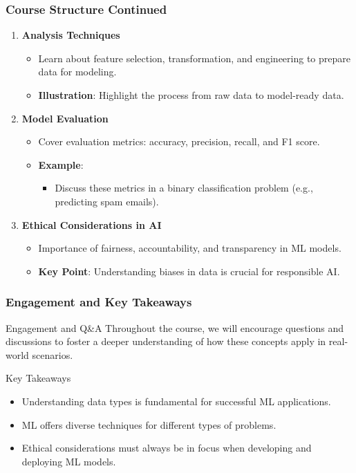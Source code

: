 \documentclass[aspectratio=169]{beamer}
\begin{document}
\begin{frame}[fragile]
    \frametitle{Course Structure Continued}
    \begin{enumerate}[resume]
        \item \textbf{Analysis Techniques}
        \begin{itemize}
            \item Learn about feature selection, transformation, and engineering to prepare data for modeling.
            \item \textbf{Illustration}: Highlight the process from raw data to model-ready data.
        \end{itemize}

        \item \textbf{Model Evaluation}
        \begin{itemize}
            \item Cover evaluation metrics: accuracy, precision, recall, and F1 score.
            \item \textbf{Example}:
            \begin{itemize}
                \item Discuss these metrics in a binary classification problem (e.g., predicting spam emails).
            \end{itemize}
        \end{itemize}

        \item \textbf{Ethical Considerations in AI}
        \begin{itemize}
            \item Importance of fairness, accountability, and transparency in ML models.
            \item \textbf{Key Point}: Understanding biases in data is crucial for responsible AI.
        \end{itemize}
    \end{enumerate}
\end{frame}

\begin{frame}[fragile]
    \frametitle{Engagement and Key Takeaways}
    \begin{block}{Engagement and Q\&A}
        Throughout the course, we will encourage questions and discussions to foster a deeper understanding of how these concepts apply in real-world scenarios.
    \end{block}

    \begin{block}{Key Takeaways}
        \begin{itemize}
            \item Understanding data types is fundamental for successful ML applications.
            \item ML offers diverse techniques for different types of problems.
            \item Ethical considerations must always be in focus when developing and deploying ML models.
        \end{itemize}
    \end{block}
\end{frame}
\end{document}
